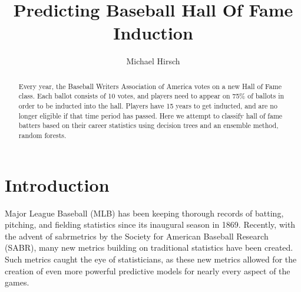 \documentclass[preprint,12pt]{elsarticle}
\begin{document}
\begin{frontmatter}


\title{Predicting Baseball Hall Of Fame Induction}




\author{Michael Hirsch}
\address{ILLC, University of Amsterdam}
\address{michaelahirsch@gmail.com}

\begin{abstract}
Every year, the Baseball Writers Association of America votes on a new Hall of Fame class. Each ballot consists of 10 votes, and players need to appear on 75\% of ballots in order to be inducted into the hall. Players have 15 years to get inducted, and are no longer eligible if that time period has passed. Here we attempt to classify hall of fame batters based on their career statistics using decision trees and an ensemble method, random forests.
\end{abstract}


\end{frontmatter}

\section{Introduction}
\label{intro}
Major League Baseball (MLB) has been keeping thorough records of batting, pitching, and fielding statistics since its inaugural season in 1869. Recently, with the advent of sabrmetrics by the Society for American Baseball Research (SABR), many  new metrics building on traditional statistics have been created. Such metrics caught the eye of statisticians, as these new metrics allowed for the creation of even more powerful predictive models for nearly every aspect of the games. 
\end{document}
